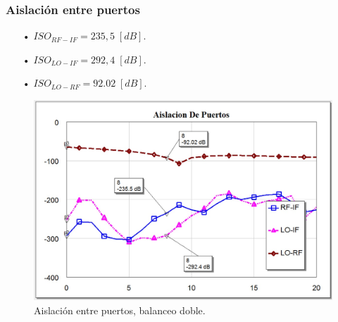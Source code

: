 \documentclass[twocolumn]{article}
\begin{document}
\subsubsection{Aislación entre puertos}
%
\begin{itemize}\itemsep0em
\item[•]  $ISO_{RF-IF} = 235,5 \; [dB]$.
\item[•]  $ISO_{LO-IF} = 292,4 \; [dB]$.
\item[•]  $ISO_{LO-RF} = 92.02 \; [dB]$.
\end{itemize}
%
\begin{figure}[h]
  \centering    
	\includegraphics[scale=0.3]{imagenes/ISO3.jpg}
	\caption{Aislación entre puertos, balanceo doble.}\label{fig:ISO3}
\end{figure}
%
\end{document}
